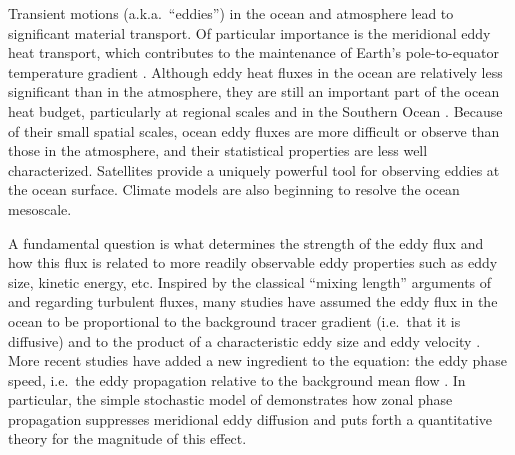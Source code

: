 \documentclass[10pt]{article}
\begin{document}
Transient motions (a.k.a.~``eddies'') in the ocean and atmosphere lead to significant material transport. Of particular importance is the meridional eddy heat transport, which contributes to the maintenance of Earth's pole-to-equator temperature gradient \citep{TrenberthCaron2001,Wunsch2005}. Although eddy heat fluxes in the ocean are relatively less significant than in the atmosphere, they are still an important part of the ocean heat budget, particularly at regional scales and in the Southern Ocean \citep{JayneMarotzke2002,WhatElse?}. Because of their small spatial scales, ocean eddy fluxes are more difficult or observe than those in the atmosphere, and their statistical properties are less well characterized. Satellites provide a uniquely powerful tool for observing eddies at the ocean surface. Climate models are also beginning to resolve the ocean mesoscale.

A fundamental question is what determines the strength of the eddy flux and how this flux is related to more readily observable eddy properties such as eddy size, kinetic energy, etc.
Inspired by the classical ``mixing length'' arguments of \citet{Taylor1915} and \citet{Prandtl1925} regarding turbulent fluxes, many studies have assumed the eddy flux in the ocean to be proportional to the background tracer gradient (i.e.~that it is diffusive) and to the product of a characteristic eddy size and eddy velocity \citep[e.g.][]{Holloway1986,KefferHolloway1988,VisbeckEtAl1997,Stammer1998}. More recent studies have added a new ingredient to the equation: the eddy phase speed, i.e.~the eddy propagation relative to the background mean flow \citep{MarshallEtAl2006,SmithMarshall2009,AbernatheyEtAl2010,FerrariNikurashin2010,KlockerEtAl2012a,KlockerEtAl2012b,AbernatheyMarshall2013}. In particular, the simple stochastic model of \citet{FerrariNikurashin2010} demonstrates how zonal phase propagation suppresses meridional eddy diffusion and puts forth a quantitative theory for the magnitude of this effect.
\end{document}
